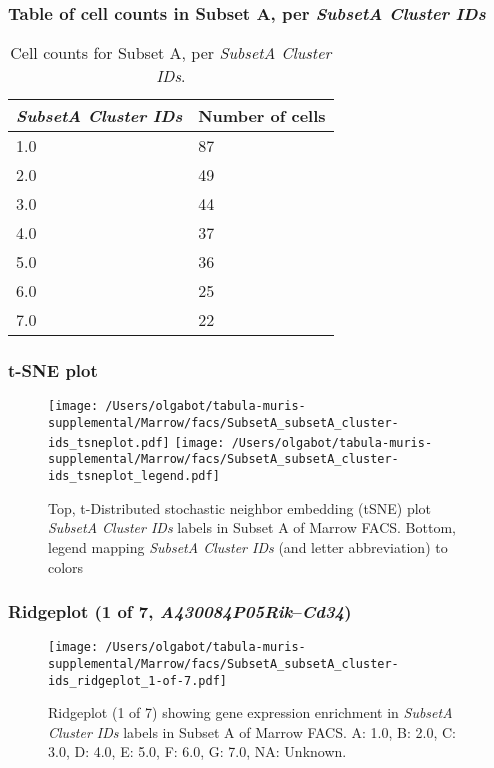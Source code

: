 \subsubsection{Table of cell counts in Subset A, per \emph{SubsetA Cluster IDs}}\begin{table}[h]
\centering
\label{my-label}
\begin{tabular}{@{}ll@{}}
\toprule

\emph{SubsetA Cluster IDs}& Number of cells \\ \midrule
1.0 & 87 \\

2.0 & 49 \\

3.0 & 44 \\

4.0 & 37 \\

5.0 & 36 \\

6.0 & 25 \\

7.0 & 22 \\
\bottomrule
\end{tabular}
\caption{Cell counts for Subset A, per \emph{SubsetA Cluster IDs}.}
\end{table}

\clearpage
\subsubsection{t-SNE plot}
\begin{figure}[h]
\centering
\texttt{[image: /Users/olgabot/tabula-muris-supplemental/Marrow/facs/SubsetA\_subsetA\_cluster-ids\_tsneplot.pdf]}
\texttt{[image: /Users/olgabot/tabula-muris-supplemental/Marrow/facs/SubsetA\_subsetA\_cluster-ids\_tsneplot\_legend.pdf]}
\caption{Top, t-Distributed stochastic neighbor embedding (tSNE) plot  \emph{SubsetA Cluster IDs} labels in Subset A of Marrow FACS. Bottom, legend mapping \emph{SubsetA Cluster IDs} (and letter abbreviation) to colors}
\end{figure}


\clearpage

\subsubsection{Ridgeplot (1 of 7, \emph{A430084P05Rik}--\emph{Cd34})}
\begin{figure}[h]
\centering
\texttt{[image: /Users/olgabot/tabula-muris-supplemental/Marrow/facs/SubsetA\_subsetA\_cluster-ids\_ridgeplot\_1-of-7.pdf]}

\caption{ Ridgeplot (1 of 7)  showing gene expression enrichment in \emph{SubsetA Cluster IDs} labels in Subset A of Marrow FACS. A: 1.0, B: 2.0, C: 3.0, D: 4.0, E: 5.0, F: 6.0, G: 7.0, NA: Unknown.}
\end{figure}


